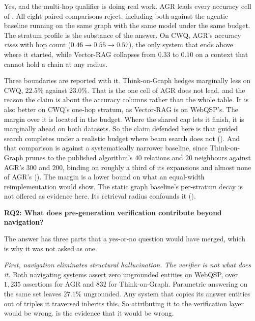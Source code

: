 Yes, and the multi-hop qualifier is doing real work. AGR leads every accuracy
cell of . All eight paired comparisons reject, including both
against the agentic baseline running on the same graph with the same model under
the same budget. The stratum profile is the substance of the answer. On CWQ,
AGR's accuracy \emph{rises} with hop count ($0.46 \to 0.55 \to 0.57$), the only
system that ends above where it started, while Vector-RAG collapses from $0.33$
to $0.10$ on a context that cannot hold a chain at any radius.

Three boundaries are reported with it. Think-on-Graph hedges marginally less on
CWQ, $22.5\%$ against $23.0\%$. That is the one cell of  AGR does
not lead, and the reason the claim is about the accuracy columns rather than the
whole table. It is also better on CWQ's one-hop stratum, as Vector-RAG is on
WebQSP's. The margin over it is located in the budget. Where the shared cap lets
it finish, it is marginally ahead on both datasets. So the claim defended here
is that guided search completes under a realistic budget where beam search does
not (). And that comparison is against a systematically
narrower baseline, since Think-on-Graph prunes to the published algorithm's $40$
relations and $20$ neighbours against AGR's $300$ and $200$, binding on roughly
a third of its expansions and almost none of AGR's ().
The margin is a lower bound on what an equal-width reimplementation would show.
The static graph baseline's per-stratum decay is not offered as evidence here.
Its retrieval radius confounds it ().

\textbf{RQ2: What does pre-generation verification contribute beyond
navigation?}

The answer has three parts that a yes-or-no question would have merged, which is
why it was not asked as one.

\emph{First, navigation eliminates structural hallucination. The verifier is not
what does it.} Both navigating systems assert zero ungrounded entities on
WebQSP, over $1{,}235$ assertions for AGR and $832$ for Think-on-Graph.
Parametric answering on the same set leaves $27.1\%$ ungrounded. Any system that
copies its answer entities out of triples it traversed inherits this. So
attributing it to the verification layer would be wrong. 
is the evidence that it would be wrong.

